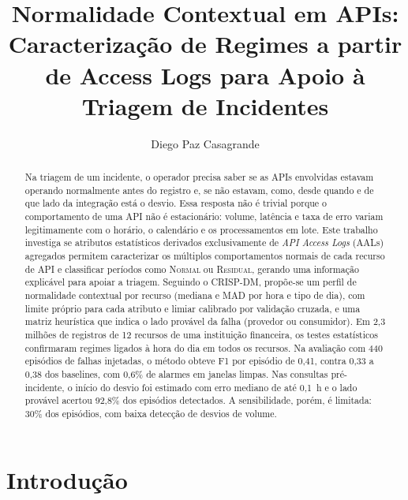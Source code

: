 \documentclass[sigconf,nonacm]{acmart}
\newcommand{\Normal}{\textsc{Normal}\xspace}
\newcommand{\Residual}{\textsc{Residual}\xspace}
\begin{document}
\title{Normalidade Contextual em APIs: Caracterização de Regimes a partir de Access Logs para Apoio à Triagem de Incidentes}

\author{Diego Paz Casagrande}

\renewcommand{\shortauthors}{D. P. Casagrande}

\begin{abstract}
Na triagem de um incidente, o operador precisa saber se as APIs envolvidas estavam operando normalmente antes do registro e, se não estavam, como, desde quando e de que lado da integração está o desvio. Essa resposta não é trivial porque o comportamento de uma API não é estacionário: volume, latência e taxa de erro variam legitimamente com o horário, o calendário e os processamentos em lote. Este trabalho investiga se atributos estatísticos derivados exclusivamente de \emph{API Access Logs} (AALs) agregados permitem caracterizar os múltiplos comportamentos normais de cada recurso de API e classificar períodos como \Normal ou \Residual, gerando uma informação explicável para apoiar a triagem. Seguindo o CRISP-DM, propõe-se um perfil de normalidade contextual por recurso (mediana e MAD por hora e tipo de dia), com limite próprio para cada atributo e limiar calibrado por validação cruzada, e uma matriz heurística que indica o lado provável da falha (provedor ou consumidor). Em 2,3 milhões de registros de 12 recursos de uma instituição financeira, os testes estatísticos confirmaram regimes ligados à hora do dia em todos os recursos. Na avaliação com 440 episódios de falhas injetadas, o método obteve F1 por episódio de 0,41, contra 0,33 a 0,38 dos baselines, com 0,6\% de alarmes em janelas limpas. Nas consultas pré-incidente, o início do desvio foi estimado com erro mediano de até 0,1~h e o lado provável acertou 92,8\% dos episódios detectados. A sensibilidade, porém, é limitada: 30\% dos episódios, com baixa detecção de desvios de volume.
\end{abstract}


\maketitle

\section{Introdução}
\end{document}
